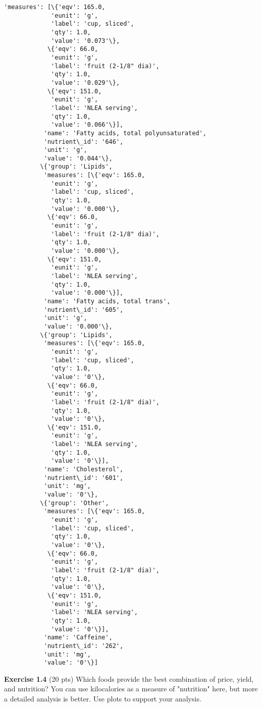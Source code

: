 \documentclass[11pt]{article}
\begin{document}
\begin{Verbatim}[commandchars=\\\{\}]
           'measures': [\{'eqv': 165.0,
             'eunit': 'g',
             'label': 'cup, sliced',
             'qty': 1.0,
             'value': '0.073'\},
            \{'eqv': 66.0,
             'eunit': 'g',
             'label': 'fruit (2-1/8" dia)',
             'qty': 1.0,
             'value': '0.029'\},
            \{'eqv': 151.0,
             'eunit': 'g',
             'label': 'NLEA serving',
             'qty': 1.0,
             'value': '0.066'\}],
           'name': 'Fatty acids, total polyunsaturated',
           'nutrient\_id': '646',
           'unit': 'g',
           'value': '0.044'\},
          \{'group': 'Lipids',
           'measures': [\{'eqv': 165.0,
             'eunit': 'g',
             'label': 'cup, sliced',
             'qty': 1.0,
             'value': '0.000'\},
            \{'eqv': 66.0,
             'eunit': 'g',
             'label': 'fruit (2-1/8" dia)',
             'qty': 1.0,
             'value': '0.000'\},
            \{'eqv': 151.0,
             'eunit': 'g',
             'label': 'NLEA serving',
             'qty': 1.0,
             'value': '0.000'\}],
           'name': 'Fatty acids, total trans',
           'nutrient\_id': '605',
           'unit': 'g',
           'value': '0.000'\},
          \{'group': 'Lipids',
           'measures': [\{'eqv': 165.0,
             'eunit': 'g',
             'label': 'cup, sliced',
             'qty': 1.0,
             'value': '0'\},
            \{'eqv': 66.0,
             'eunit': 'g',
             'label': 'fruit (2-1/8" dia)',
             'qty': 1.0,
             'value': '0'\},
            \{'eqv': 151.0,
             'eunit': 'g',
             'label': 'NLEA serving',
             'qty': 1.0,
             'value': '0'\}],
           'name': 'Cholesterol',
           'nutrient\_id': '601',
           'unit': 'mg',
           'value': '0'\},
          \{'group': 'Other',
           'measures': [\{'eqv': 165.0,
             'eunit': 'g',
             'label': 'cup, sliced',
             'qty': 1.0,
             'value': '0'\},
            \{'eqv': 66.0,
             'eunit': 'g',
             'label': 'fruit (2-1/8" dia)',
             'qty': 1.0,
             'value': '0'\},
            \{'eqv': 151.0,
             'eunit': 'g',
             'label': 'NLEA serving',
             'qty': 1.0,
             'value': '0'\}],
           'name': 'Caffeine',
           'nutrient\_id': '262',
           'unit': 'mg',
           'value': '0'\}]
\end{Verbatim}
            
    \textbf{Exercise 1.4} (20 pts) Which foods provide the best combination
of price, yield, and nutrition? You can use kilocalories as a measure of
"nutrition" here, but more a detailed analysis is better. Use plots to
support your analysis.
\end{document}
